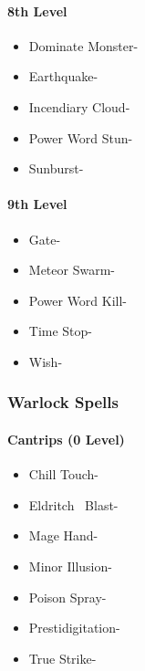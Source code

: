 \documentclass[
]{article}
\providecommand{\tightlist}{%
  \setlength{\itemsep}{0pt}\setlength{\parskip}{0pt}}
\begin{document}
\hypertarget{8th-level-3}{%
\paragraph{8th Level}\label{8th-level-3}}

\begin{itemize}
\tightlist
\item
  Dominate Monster-
\item
  Earthquake-
\item
  Incendiary Cloud-
\item
  Power Word Stun-
\item
  Sunburst-
\end{itemize}

\hypertarget{9th-level-3}{%
\paragraph{9th Level}\label{9th-level-3}}

\begin{itemize}
\tightlist
\item
  Gate-
\item
  Meteor Swarm-
\item
  Power Word Kill-
\item
  Time Stop-
\item
  Wish-
\end{itemize}

\hypertarget{warlock-spells}{%
\subsubsection{Warlock Spells}\label{warlock-spells}}

\hypertarget{cantrips-0-level-4}{%
\paragraph{Cantrips (0 Level)}\label{cantrips-0-level-4}}

\begin{itemize}
\tightlist
\item
  Chill Touch-
\item
  Eldritch ~Blast-
\item
  Mage Hand-
\item
  Minor Illusion-
\item
  Poison Spray-
\item
  Prestidigitation-
\item
  True Strike-
\end{itemize}
\end{document}
